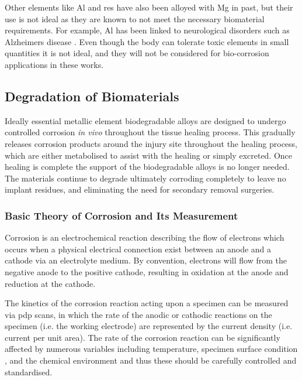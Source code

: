 \documentclass[a4paper,12pt,oneside]{report}%
\begin{document}
Other elements like Al and \glspl{re} have also been alloyed with Mg in past, but their use is not ideal as they are known to not meet the necessary biomaterial requirements. For example, Al has been linked to neurological disorders such as Alzheimers disease \cite{Zheng2014}. Even though the body can tolerate toxic elements in small quantities it is not ideal, and they will not be considered for bio-corrosion applications in these works. 

\subsection{Degradation of Biomaterials} 
Ideally essential metallic element biodegradable alloys are designed to undergo controlled corrosion \textit{in vivo} throughout the tissue healing process. This gradually releases corrosion products around the injury site throughout the healing process, which are either metabolised to assist with the healing or simply excreted. Once healing is complete the support of the biodegradable alloys is no longer needed. The materials continue to degrade ultimately corroding completely to leave no implant residues, and eliminating the need for secondary removal surgeries. 

\subsubsection{Basic Theory of Corrosion and Its Measurement}
Corrosion is an electrochemical reaction describing the flow of electrons which occurs when a physical electrical connection exist between an anode and a cathode via an electrolyte medium. By convention, electrons will flow from the negative anode to the positive cathode,  resulting in oxidation at the anode and reduction at the cathode. 

The kinetics of the corrosion reaction acting upon a specimen can be measured via \gls{pdp} scans, in which the rate of the anodic or cathodic reactions on the specimen (i.e. the working electrode) are represented by the current density (i.e. current per unit area). The rate of the corrosion reaction can be significantly affected by numerous variables including temperature, specimen surface condition \cite{Jones1992}, and the chemical environment and thus these should be carefully controlled and standardised. 
\end{document}

